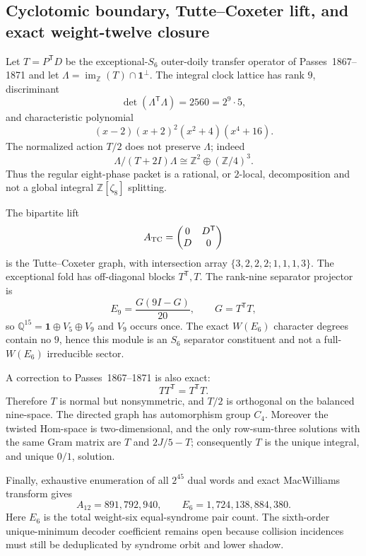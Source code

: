 \subsection{Cyclotomic boundary, Tutte--Coxeter lift, and exact weight-twelve closure}
Let $T=P^{\mathsf T}D$ be the exceptional-$S_6$ outer-doily transfer operator
of Passes~1867--1871 and let
$\Lambda=\operatorname{im}_{\mathbb Z}(T)\cap\mathbf1^\perp$.
The integral clock lattice has rank $9$, discriminant
\[
 \det(\Lambda^{\mathsf T}\Lambda)=2560=2^9\cdot5,
\]
and characteristic polynomial
\[
 (x-2)(x+2)^2(x^2+4)(x^4+16).
\]
The normalized action $T/2$ does not preserve $\Lambda$; indeed
\[
 \Lambda/(T+2I)\Lambda\cong\mathbb Z^2\oplus(\mathbb Z/4)^3.
\]
Thus the regular eight-phase packet is a rational, or $2$-local, decomposition
and not a global integral $\mathbb Z[\zeta_8]$ splitting.

The bipartite lift
\[
 A_{\rm TC}=\begin{pmatrix}0&D^{\mathsf T}\\D&0\end{pmatrix}
\]
is the Tutte--Coxeter graph, with intersection array
$\{3,2,2,2;1,1,1,3\}$. The exceptional fold has off-diagonal blocks
$T^{\mathsf T},T$. The rank-nine separator projector is
\[
 E_9=\frac{G(9I-G)}{20},\qquad G=T^{\mathsf T}T,
\]
so $\mathbb Q^{15}=\mathbf1\oplus V_5\oplus V_9$ and $V_9$ occurs once.
The exact $W(E_6)$ character degrees contain no $9$, hence this module is an
$S_6$ separator constituent and not a full-$W(E_6)$ irreducible sector.

A correction to Passes~1867--1871 is also exact:
\[
 TT^{\mathsf T}=T^{\mathsf T}T.
\]
Therefore $T$ is normal but nonsymmetric, and $T/2$ is orthogonal on the
balanced nine-space. The directed graph has automorphism group $C_4$.
Moreover the twisted Hom-space is two-dimensional, and the only row-sum-three
solutions with the same Gram matrix are $T$ and $2J/5-T$; consequently $T$ is
the unique integral, and unique $0/1$, solution.

Finally, exhaustive enumeration of all $2^{45}$ dual words and exact
MacWilliams transform gives
\[
 \boxed{A_{12}=891{,}792{,}940},
 \qquad
 \boxed{E_6=1{,}724{,}138{,}884{,}380}.
\]
Here $E_6$ is the total weight-six equal-syndrome pair count. The sixth-order
unique-minimum decoder coefficient remains open because collision incidences
must still be deduplicated by syndrome orbit and lower shadow.
